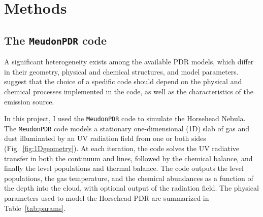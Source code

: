 \documentclass[12pt,a4paper]{article}
\newcommand{\mdpdr}{\texttt{MeudonPDR} code}
\begin{document}
\section{Methods} \label{sec:methods}
\subsection{The \mdpdr{}} \label{sec:mdpdr}
A significant heterogeneity exists among the available PDR models, which differ in their geometry, physical and chemical structures, and model parameters. \textcite{Röllig2007} suggest that the choice of a spedific code should depend on the physical and chemical processes implemented in the code, as well as the characteristics of the emission source. 

In this project, I used the \mdpdr{} \parencite{LePetit2006,Goicoechea2007,Gonzalez2008,LeBourlot2012,Bron_thesis,Bron2014,Bron2016} to simulate the Horsehead Nebula. The \mdpdr{} models a stationary one-dimensional (1D) slab of gas and dust illuminated by an UV radiation field from one or both sides (Fig.~\ref{fig:1Dgeometry}). At each iteration, the code solves the UV radiative transfer in both the continuum and lines, followed by the chemical balance, and finally the level populations and thermal balance. The code outputs the level populations, the gas temperature, and the chemical abundances as a function of the depth into the cloud, with optional output of the radiation field. The physical parameters used to model the Horsehead PDR are summarized in Table~\ref{tab:params}.
\end{document}
